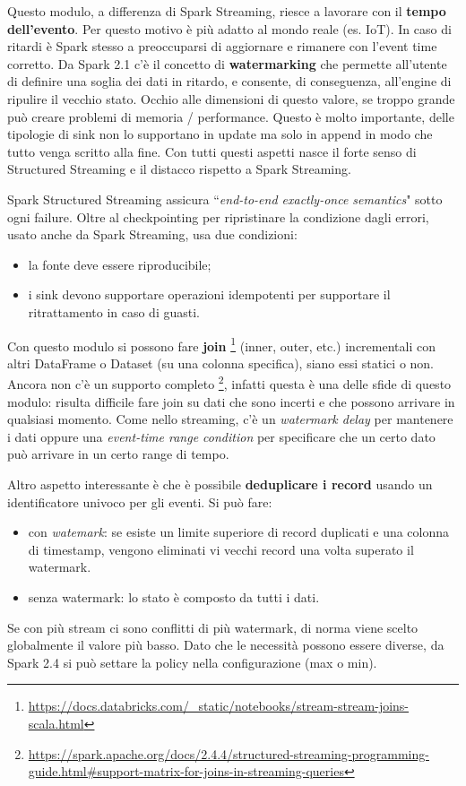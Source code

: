 \documentclass[12pt,italian]{article}
\begin{document}
\par Questo modulo, a differenza di Spark Streaming, riesce a lavorare con il \textbf{tempo dell'evento}. Per questo motivo è più adatto al mondo reale (es. IoT).
In caso di ritardi è Spark stesso a preoccuparsi di aggiornare e rimanere con l'event time corretto.
Da Spark 2.1 c'è il concetto di \textbf{watermarking} che permette all'utente di definire una soglia dei dati in ritardo, e consente, di conseguenza, all'engine di ripulire il vecchio stato.
Occhio alle dimensioni di questo valore, se troppo grande può creare problemi di memoria / performance. Questo è molto importante, delle tipologie di sink non lo supportano in update ma solo in append in modo  che tutto venga scritto alla fine.
\newline
Con tutti questi aspetti nasce il forte senso di Structured Streaming e il distacco rispetto a  Spark Streaming.
\par Spark Structured Streaming assicura ``\textit{end-to-end exactly-once semantics}" sotto ogni failure.
Oltre al checkpointing per ripristinare la condizione dagli errori, usato anche da Spark Streaming, usa due condizioni:
\begin{itemize}
	\item la fonte deve essere riproducibile;
	\item i sink devono supportare operazioni idempotenti per supportare il ritrattamento in caso di guasti.
\end{itemize}
\par Con questo modulo si possono fare \textbf{join} \footnote{\url{https://docs.databricks.com/_static/notebooks/stream-stream-joins-scala.html}} (inner, outer, etc.) incrementali con altri DataFrame o Dataset (su una colonna specifica), siano essi statici o non.
Ancora non c'è un supporto completo \footnote{\url{https://spark.apache.org/docs/2.4.4/structured-streaming-programming-guide.html\#support-matrix-for-joins-in-streaming-queries}}, infatti questa è una delle sfide di questo modulo: risulta difficile fare join su dati che sono incerti e che possono arrivare in qualsiasi momento. Come nello streaming, c'è un \textit{watermark delay} per mantenere i dati oppure una \textit{event-time range condition} per specificare che un certo dato può arrivare in un certo range di tempo.

\par Altro aspetto interessante è che è possibile \textbf{deduplicare i record} usando un identificatore univoco per gli eventi. Si può fare:
\begin{itemize}
	\item con \textit{watemark}: se esiste un limite superiore di record duplicati e una colonna di timestamp, vengono eliminati vi vecchi record una volta superato il watermark.
	\item senza watermark: lo stato è composto da tutti i dati.
\end{itemize}
Se con più stream ci sono conflitti di più watermark, di norma viene scelto globalmente il valore più basso. Dato che le necessità possono essere diverse, da Spark 2.4 si può
settare la policy nella configurazione (max o min).
\end{document}
